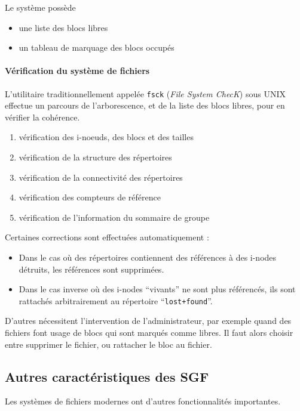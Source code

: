 \begin{multicols}{2}
Le système possède
\begin{itemize}
\item une liste des blocs libres
\item un tableau de marquage des blocs occupés
\end{itemize}



\paragraph{Vérification du système de fichiers}

L'utilitaire traditionnellement appelée \texttt{fsck} (\emph{File
  System ChecK}) sous UNIX effectue un parcours de l'arborescence, et
de la liste des blocs libres, pour en vérifier la cohérence.

\begin{enumerate}
\item vérification des i-noeuds, des blocs et des tailles
\item vérification de la structure des répertoires
\item vérification de la connectivité des répertoires
\item vérification des compteurs de référence
\item vérification de l'information du sommaire de groupe
\end{enumerate}

Certaines corrections sont effectuées automatiquement :
\begin{itemize}
\item
Dans le cas où des répertoires contiennent des références à des i-nodes
détruits, les références sont supprimées.
\item 
Dans le cas inverse où des i-nodes ``vivants'' ne sont plus référencés,
ils sont rattachés arbitrairement au répertoire ``\texttt{lost+found}''.
\end{itemize}

D'autres nécessitent l'intervention de l'administrateur, par exemple
quand des fichiers font usage de blocs qui sont marqués comme libres.
Il faut alors choisir entre supprimer le fichier, ou rattacher le bloc
au fichier.

\subsection{Autres caractéristiques des SGF}

Les systèmes de fichiers modernes ont d'autres fonctionnalités 
importantes.


\end{multicols}
